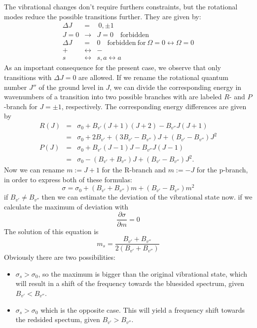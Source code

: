 The vibrational changes don't require furthers constraints, but the rotational 
modes reduce the possible transitions further. They are given by:
\begin{eqnarray}
    \Delta J \ &=&  \  0, \pm 1 \\
    J = 0 &\rightarrow& J = 0 \quad \mathrm{forbidden}\\
    \Delta J &=& 0 \quad \mathrm{forbidden \ for \ } \Omega = 0 \leftrightarrow \Omega = 0 \\
    + &\leftrightarrow& - \\
    s &\leftrightarrow& s, a \leftrightarrow a
\end{eqnarray}
As an important consequence for the present case, we observe that only 
transitions with $\Delta J = 0$ are allowed. If we rename the rotational 
quantum number $J''$ of the ground level in $J$, we can divide the corresponding 
energy in wavenumbers of a transition into two possible branches with are 
labeled $R$- and $P$-branch for $J = \pm 1$, respectively. The corresponding 
energy differences are given by
\begin{eqnarray}
    R(J) &=& \sigma_0 + B_{v'}(J + 1)(J + 2) - B_{v''}J (J + 1) \nonumber \\
         &=& \sigma_0 + 2 B_{v'} + (3 B_{v'} - B_{v''})J + (B_{v'} - B_{v''})J^2 \\
    P(J) &=& \sigma_0 + B_{v'}(J - 1)J - B_{v''}J (J - 1) \nonumber \\
         &=& \sigma_0 - (B_{v'} + B_{v''})J + (B_{v'} - B_{v''})J^2.
\end{eqnarray}
Now we can rename $m:= J+1$ for the R-branch and $m:= - J$ for 
the p-branch, in order to express both of these formulas:
\begin{equation}
    \sigma = \sigma_0 + (B_{v'} + B_{v''})m
    +  (B_{v'} - B_{v''})m^2
\end{equation}
if $B_{v'} \neq B_{v''}$ then we can estimate the deviation of
the vibrational state now. if we calculate the maximum of
deviation with
\begin{equation}
    \frac{\partial \sigma}{\partial m} = 0 
\end{equation}
The solution of this equation is
\begin{equation}
    m_s = \frac{B_{v'} + B_{v''}}{2(B_{v'} + B_{v''})}
\end{equation}
Obviously there are two possibilities:
\begin{itemize}
        \item $\sigma_s > \sigma_0$, so the maximum is bigger than
            the original vibrational state, which will result
            in a shift of the frequency towards the bluesided
            spectrum, given $B_{v'} < B_{v''}$.
        \item $\sigma_s > \sigma_0$ which is the opposite case.
            This will yield a frequency shift towards the redsided
            spectum, given $B_{v'} > B_{v''}$.
\end{itemize}
